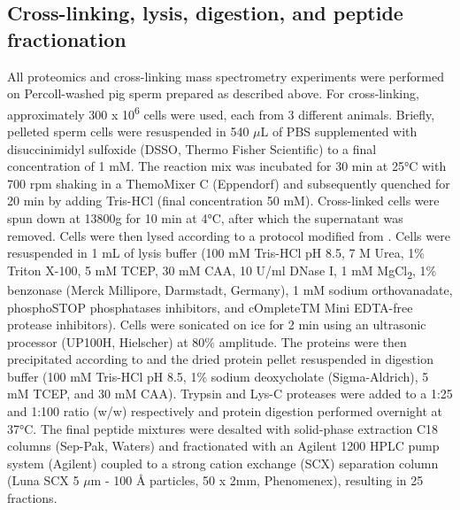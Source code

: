 \subsection*{Cross-linking, lysis, digestion, and peptide fractionation}
All proteomics and cross-linking mass spectrometry experiments were performed on Percoll-washed pig sperm prepared as described above. For cross-linking, approximately 300 x 10\textsuperscript{6} cells were used, each from 3 different animals. Briefly, pelleted sperm cells were resuspended in 540 $\mu$L of PBS supplemented with disuccinimidyl sulfoxide (DSSO, Thermo Fisher Scientific) to a final concentration of 1 mM. The reaction mix was incubated for 30 min at 25°C with 700 rpm shaking in a ThemoMixer C (Eppendorf) and subsequently quenched for 20 min by adding Tris-HCl (final concentration 50 mM). Cross-linked cells were spun down at 13800g for 10 min at 4°C, after which the supernatant was removed. Cells were then lysed according to a protocol modified from \cite{Potel2018}. Cells were resuspended in 1 mL of lysis buffer (100 mM Tris-HCl pH 8.5, 7 M Urea, 1\% Triton X-100, 5 mM TCEP, 30 mM CAA, 10 U/ml DNase I, 1 mM MgCl\textsubscript{2}, 1\% benzonase (Merck Millipore, Darmstadt, Germany), 1 mM sodium orthovanadate, phosphoSTOP phosphatases inhibitors, and cOmpleteTM Mini EDTA-free protease inhibitors). Cells were sonicated on ice for 2 min using an ultrasonic processor (UP100H, Hielscher) at 80\% amplitude. The proteins were then precipitated according to \cite{Wessel1984} and the dried protein pellet resuspended in digestion buffer (100 mM Tris-HCl pH 8.5, 1\% sodium deoxycholate (Sigma-Aldrich), 5 mM TCEP, and 30 mM CAA). Trypsin and Lys-C proteases were added to a 1:25 and 1:100 ratio (w/w) respectively and protein digestion performed overnight at 37°C. The final peptide mixtures were desalted with solid-phase extraction C18 columns (Sep-Pak, Waters) and fractionated with an Agilent 1200 HPLC pump system (Agilent) coupled to a strong cation exchange (SCX) separation column (Luna SCX 5 $\mu$m - 100 Å particles, 50 x 2mm, Phenomenex), resulting in 25 fractions.
%

